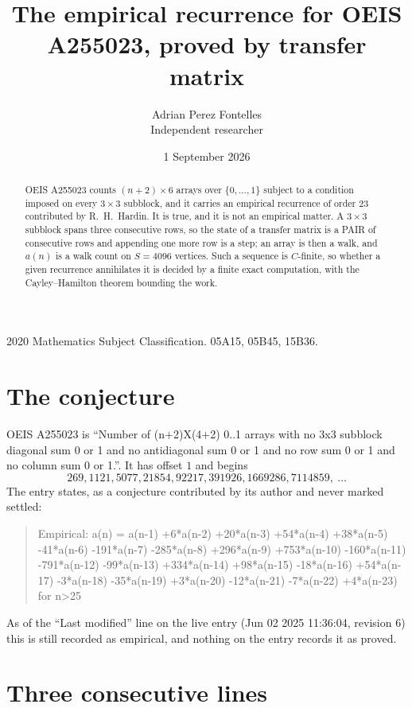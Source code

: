 \documentclass[11pt,a4paper]{article}
\title{The empirical recurrence for OEIS A255023, proved by transfer matrix}
\author{Adrian Perez Fontelles\\ \small Independent researcher}
\date{1 September 2026}
\theoremstyle{plain}
\theoremstyle{definition}
\begin{document}
\maketitle

\begin{abstract}
OEIS A255023 counts $(n+2)\times6$ arrays over $\{0,\dots,1\}$ subject to a condition imposed on
every $3\times3$ subblock, and it carries an empirical recurrence of order $23$
contributed by R.~H.~Hardin. It is true, and it is not an empirical matter. A $3\times3$
subblock spans three consecutive rows, so the state of a transfer matrix is a PAIR of
consecutive rows and appending one more row is a step; an array is then a walk, and
$a(n)$ is a walk count on $S=4096$ vertices. Such a sequence is $C$-finite, so whether a given
recurrence annihilates it is decided by a finite exact computation, with the Cayley--Hamilton
theorem bounding the work.
\end{abstract}

\noindent\small 2020 Mathematics Subject Classification. 05A15, 05B45, 15B36.\normalsize

\section{The conjecture}

OEIS A255023 is ``Number of (n+2)X(4+2) 0..1 arrays with no 3x3 subblock diagonal sum 0 or 1 and no antidiagonal sum 0 or 1 and no row sum 0 or 1 and no column sum 0 or 1.''. It has offset $1$ and begins
\[
269, 1121, 5077, 21854, 92217, 391926, 1669286, 7114859,\ \dots
\]
The entry states, as a conjecture contributed by its author and never marked settled:
\begin{quote}
Empirical: a(n) = a(n-1) +6*a(n-2) +20*a(n-3) +54*a(n-4) +38*a(n-5) -41*a(n-6) -191*a(n-7) -285*a(n-8) +296*a(n-9) +753*a(n-10) -160*a(n-11) -791*a(n-12) -99*a(n-13) +334*a(n-14) +98*a(n-15) -18*a(n-16) +54*a(n-17) -3*a(n-18) -35*a(n-19) +3*a(n-20) -12*a(n-21) -7*a(n-22) +4*a(n-23) for n>25
\end{quote}
As of the ``Last modified'' line on the live entry (Jun 02 2025 11:36:04, revision 6) this is still
recorded as empirical, and nothing on the entry records it as proved.

\section{Three consecutive lines}
\end{document}
